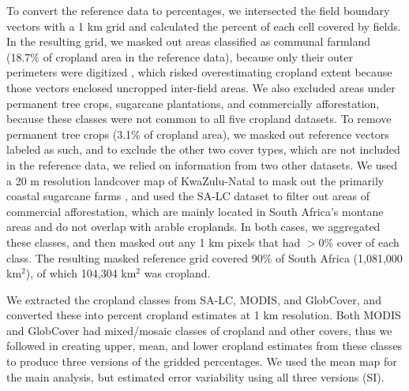 \documentclass[12 pt, titlepage, a4paper]{article}
\begin{document}
To convert the reference data to percentages, we intersected the field boundary vectors with a 1 km grid and calculated the percent of each cell covered by fields. In the resulting grid, we masked out areas classified as communal farmland (18.7\% of cropland area in the reference data), because only their outer perimeters were digitized \citep{fourie_better_2009}, which risked overestimating cropland extent because those vectors enclosed uncropped inter-field areas. We also excluded areas under permanent tree crops, sugarcane plantations, and commercially afforestation, because these classes were not common to all five cropland datasets. To remove permanent tree crops (3.1\% of cropland area), we masked out reference vectors labeled as such, and to exclude the other two cover types, which are not included in the reference data, we relied on information from two other datasets. We used a 20 m resolution landcover map of KwaZulu-Natal to mask out the primarily coastal sugarcane farms \citep[93-100\% user's and 76-98\% producer's accuracy for sugarcane classes;][]{geoterraimage_2011_2013}, and used the SA-LC dataset to filter out areas of commercial afforestation, which are mainly located in South Africa's montane areas and do not overlap with arable croplands. In both cases, we aggregated these classes, and then masked out any 1 km pixels that had $>$0\% cover of each class. The resulting masked reference grid covered 90\% of South Africa (1,081,000 km$^2$), of which 104,304 km$^2$ was cropland. 

We extracted the cropland classes from SA-LC, MODIS, and GlobCover, and converted these into percent cropland estimates at 1 km resolution. Both MODIS and GlobCover had mixed/mosaic classes of cropland and other covers, thus we followed \citet{fritz_mapping_2015} in creating upper, mean, and lower cropland estimates from these classes to produce three versions of the gridded percentages. We used the mean map for the main analysis, but estimated error variability using all three versions (SI).

\vspace{-0.3 cm}
\end{document}
